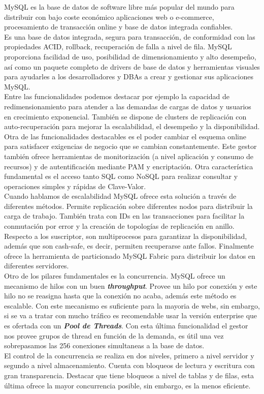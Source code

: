 \documentclass{article}
\begin{document}
MySQL es la base de datos de software libre más popular del mundo para distribuir con bajo coste económico aplicaciones web o e-commerce, procesamiento de transacción online y base de datos integrada confiables.  \\
Es una base de datos integrada, segura para transacción, de conformidad con las propiedades ACID, rollback, recuperación de falla a nivel de fila. MySQL proporciona facilidad de uso, posibilidad de dimensionamiento y alto desempeño, así como un paquete completo de drivers de base de datos y herramientas visuales para ayudarles a los desarrolladores y DBAs a crear y gestionar sus aplicaciones MySQL. \\

Entre las funcionalidades podemos destacar por ejemplo la capacidad de redimensionamiento para atender a las demandas de cargas de datos y usuarios en crecimiento exponencial. También se dispone de clusters de replicación con auto-recuperación para mejorar la escalabilidad, el desempeño y la disponibilidad.\\
Otra de las funcionalidades destacables es el poder cambiar el esquema online para satisfacer exigencias de negocio que se cambian constantemente. Este gestor también ofrece herramientas de monitorización (a nivel aplicación y consumo de recursos) y de autentificación mediante PAM y encriptación.
Otra característica fundamental es el acceso tanto SQL como NoSQL para realizar consultar y operaciones simples y rápidas de Clave-Valor.\\

Cuando hablamos de escalabilidad MySQL ofrece esta solución a través de diferentes métodos. Permite replicación sobre diferentes nodos para distribuir la carga de trabajo. También trata con IDs en las transacciones para facilitar la conmutación por error y la creación de topologías de replicación en anillo. Respecto a los suscriptor, son multiprocesos para garantizar la disponibilidad, además que son cash-safe, es decir, permiten recuperarse ante fallos. Finalmente ofrece la herramienta de particionado MySQL Fabric para distribuir los datos en diferentes servidores.\cite{lock}\\

Otro de los pilares fundamentales es la concurrencia. MySQL ofrece un mecanismo de hilos con un buen \textbf{\emph{throughput}}. Provee un hilo por conexión y este hilo no se reasigna hasta que la conexión no acaba, además este método es escalable. Con este mecanismo es suficiente para la mayoria de webs, sin embargo, si se va a tratar con mucho tráfico es recomendable usar la versión enterprise que es ofertada con un \textbf{\emph{Pool de Threads}}. Con esta última funcionalidad el gestor nos provee grupos de thread en función de la demanda, es útil una vez sobrepasamos las 256 conexiones simultaneas a la base de datos.\\
El control de la concurrencia se realiza en dos niveles, primero a nivel servidor y segundo a nivel almacenamiento. Cuenta con bloqueos de lectura y escritura con gran transparencia. Destacar que tiene bloqueos a nivel de tablas y de filas, esta última ofrece la mayor concurrencia posible, sin embargo, es la menos eficiente. \cite{enterprise}\\
\end{document}
